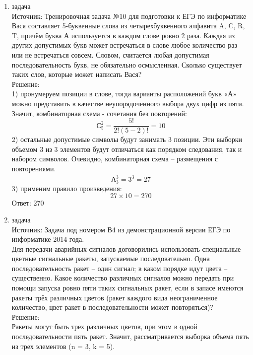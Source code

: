 \documentclass[a4paper,14pt]{extreport} %
\begin{document}
\begin{center}
\begin{enumerate}
						 
						  \item {\large задача  }\\
						 Источник: Тренировочная задача №10 для подготовки к ЕГЭ по информатике\\
						 \vspace{15pt}
						Вася составляет 5-буквенные слова из четырехбуквенного алфавита {A, C, R, T}, причём буква А используется в каждом слове ровно 2 раза. Каждая из других допустимых букв может встречаться в слове любое количество раз или не встречаться совсем. Словом, считается любая допустимая последовательность букв, не обязательно осмысленная. Сколько существует таких слов, которые может написать Вася?
						 \\
						 \vspace{15pt}
						 Решение:\\
						 1) пронумеруем позиции в слове, тогда варианты расположений букв «А» можно представить в качестве неупорядоченного выбора двух цифр из пяти. Значит, комбинаторная схема - сочетания без повторений:
						 \begin{equation}
						 	С_{5}^2 = \frac{5!}{2!(5-2)!} = 10
						 \end{equation}
						 2) остальные допустимые символы будут занимать 3 позиции. Эти выборки объемом 3 из 3 элементов будут отличаться как порядком следования, так и набором символов. Очевидно, комбинаторная схема – размещения с повторениями.
						 \begin{equation}
						 	\overline{А_{3}^3} = 3^3 = 27
						 \end{equation}
						 3) применим правило произведения: 
						 \begin{equation}
						 	27 \times 10 = 270
						 \end{equation}
						 Ответ: 270
						 
						  \item {\large задача  }\\
						 Источник: Задача под номером В4 из демонстрационной версии ЕГЭ по информатике 2014 года.\\
						 \vspace{15pt}
						 Для передачи аварийных сигналов договорились использовать специальные цветные сигнальные ракеты, запускаемые последовательно. Одна последовательность ракет – один сигнал; в каком порядке идут цвета – существенно. Какое количество различных сигналов можно передать при помощи запуска ровно пяти таких сигнальных ракет, если в запасе имеются ракеты трёх различных цветов (ракет каждого вида неограниченное количество, цвет ракет в последовательности может повторяться)?
						 \\
						 \vspace{15pt}
						 Решение:\\
						 Ракеты могут быть трех различных цветов, при этом в одной последовательности пять ракет. Значит, рассматривается выборка объема пять из трех элементов (n = 3, k = 5).
						 

\end{enumerate}
\end{center}
\end{document}
